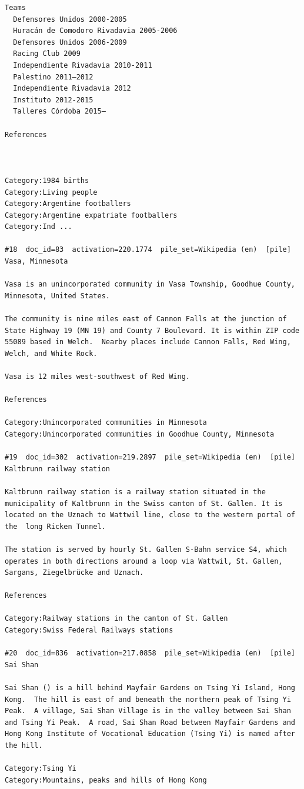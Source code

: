 \begin{verbatim}
Teams
  Defensores Unidos 2000-2005
  Huracán de Comodoro Rivadavia 2005-2006
  Defensores Unidos 2006-2009
  Racing Club 2009
  Independiente Rivadavia 2010-2011
  Palestino 2011–2012
  Independiente Rivadavia 2012
  Instituto 2012-2015
  Talleres Córdoba 2015–

References
 
 

Category:1984 births
Category:Living people
Category:Argentine footballers
Category:Argentine expatriate footballers
Category:Ind ...

#18  doc_id=83  activation=220.1774  pile_set=Wikipedia (en)  [pile]
Vasa, Minnesota

Vasa is an unincorporated community in Vasa Township, Goodhue County, Minnesota, United States.

The community is nine miles east of Cannon Falls at the junction of State Highway 19 (MN 19) and County 7 Boulevard. It is within ZIP code 55089 based in Welch.  Nearby places include Cannon Falls, Red Wing, Welch, and White Rock.

Vasa is 12 miles west-southwest of Red Wing.

References

Category:Unincorporated communities in Minnesota
Category:Unincorporated communities in Goodhue County, Minnesota

#19  doc_id=302  activation=219.2897  pile_set=Wikipedia (en)  [pile]
Kaltbrunn railway station

Kaltbrunn railway station is a railway station situated in the municipality of Kaltbrunn in the Swiss canton of St. Gallen. It is located on the Uznach to Wattwil line, close to the western portal of the  long Ricken Tunnel.

The station is served by hourly St. Gallen S-Bahn service S4, which operates in both directions around a loop via Wattwil, St. Gallen, Sargans, Ziegelbrücke and Uznach.

References 

Category:Railway stations in the canton of St. Gallen
Category:Swiss Federal Railways stations

#20  doc_id=836  activation=217.0858  pile_set=Wikipedia (en)  [pile]
Sai Shan

Sai Shan () is a hill behind Mayfair Gardens on Tsing Yi Island, Hong Kong.  The hill is east of and beneath the northern peak of Tsing Yi Peak.  A village, Sai Shan Village is in the valley between Sai Shan and Tsing Yi Peak.  A road, Sai Shan Road between Mayfair Gardens and Hong Kong Institute of Vocational Education (Tsing Yi) is named after the hill.

Category:Tsing Yi
Category:Mountains, peaks and hills of Hong Kong

\end{verbatim}

